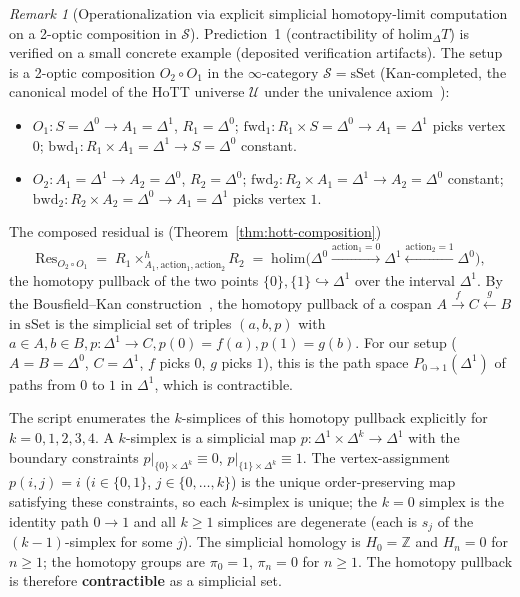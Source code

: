 \documentclass[11pt,a4paper]{article}
\theoremstyle{plain}
\theoremstyle{definition}
\theoremstyle{remark}
\newtheorem{remark}[theorem]{Remark}
\begin{document}
\begin{remark}[Operationalization via explicit simplicial homotopy-limit
computation on a 2-optic composition in $\mathcal{S}$]
\label{rem:hott-holim}
Prediction~1 (contractibility of $\mathrm{holim}_\Delta T$) is verified
on a small concrete example (deposited verification artifacts). The setup is a 2-optic composition
$O_2 \circ O_1$ in the $\infty$-category $\mathcal{S} = \mathrm{sSet}$
(Kan-completed, the canonical model of the HoTT universe $\mathcal{U}$
under the univalence axiom~\cite{hottbook2013}):
\begin{itemize}[leftmargin=*, itemsep=2pt]
\item $O_1 : S = \Delta^0 \to A_1 = \Delta^1$, $R_1 = \Delta^0$;
  $\mathrm{fwd}_1 : R_1 \times S = \Delta^0 \to A_1 = \Delta^1$ picks
  vertex $0$;
  $\mathrm{bwd}_1 : R_1 \times A_1 = \Delta^1 \to S = \Delta^0$
  constant.
\item $O_2 : A_1 = \Delta^1 \to A_2 = \Delta^0$, $R_2 = \Delta^0$;
  $\mathrm{fwd}_2 : R_2 \times A_1 = \Delta^1 \to A_2 = \Delta^0$
  constant;
  $\mathrm{bwd}_2 : R_2 \times A_2 = \Delta^0 \to A_1 = \Delta^1$
  picks vertex $1$.
\end{itemize}
The composed residual is (Theorem~\ref{thm:hott-composition})
\[
  \mathrm{Res}_{O_2 \circ O_1} \;=\; R_1 \times^h_{A_1, \mathrm{action}_1, \mathrm{action}_2} R_2
  \;=\; \mathrm{holim}\bigl( \Delta^0 \xrightarrow{\mathrm{action}_1 = 0} \Delta^1 \xleftarrow{\mathrm{action}_2 = 1} \Delta^0 \bigr),
\]
the homotopy pullback of the two points $\{0\}, \{1\} \hookrightarrow
\Delta^1$ over the interval $\Delta^1$. By the Bousfield--Kan
construction~\cite[Ch.~XI]{cisinski2019}, the homotopy pullback of a
cospan $A \xrightarrow{f} C \xleftarrow{g} B$ in $\mathrm{sSet}$ is
the simplicial set of triples $(a, b, p)$ with $a \in A, b \in B, p :
\Delta^1 \to C, p(0) = f(a), p(1) = g(b)$. For our setup
($A = B = \Delta^0$, $C = \Delta^1$, $f$ picks $0$, $g$ picks $1$),
this is the path space $P_{0 \to 1}(\Delta^1)$ of paths from $0$ to
$1$ in $\Delta^1$, which is contractible.

The script enumerates the $k$-simplices of this homotopy pullback
explicitly for $k = 0, 1, 2, 3, 4$. A $k$-simplex is a simplicial
map $p : \Delta^1 \times \Delta^k \to \Delta^1$ with the boundary
constraints $p|_{\{0\} \times \Delta^k} \equiv 0$,
$p|_{\{1\} \times \Delta^k} \equiv 1$. The vertex-assignment
$p(i, j) = i$ ($i \in \{0, 1\}$, $j \in \{0, \ldots, k\}$) is the
unique order-preserving map satisfying these constraints, so each
$k$-simplex is unique; the $k = 0$ simplex is the identity path
$0 \to 1$ and all $k \geq 1$ simplices are degenerate (each is
$s_j$ of the $(k-1)$-simplex for some $j$). The simplicial homology
is $H_0 = \mathbb{Z}$ and $H_n = 0$ for $n \geq 1$; the homotopy
groups are $\pi_0 = 1$, $\pi_n = 0$ for $n \geq 1$. The homotopy
pullback is therefore \textbf{contractible} as a simplicial set.


\end{remark}
\end{document}
